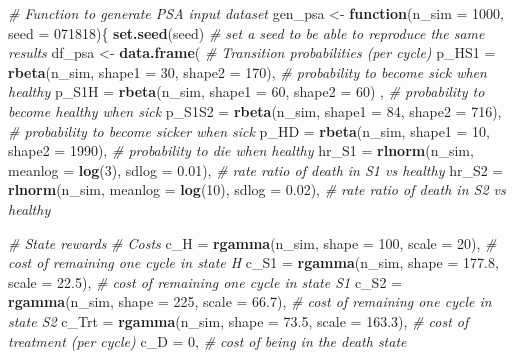 \documentclass[
]{article}
\newenvironment{Shaded}{\begin{snugshade}}{\end{snugshade}}
\newcommand{\CommentTok}[1]{\textcolor[rgb]{0.56,0.35,0.01}{\textit{#1}}}
\newcommand{\ControlFlowTok}[1]{\textcolor[rgb]{0.13,0.29,0.53}{\textbf{#1}}}
\newcommand{\DataTypeTok}[1]{\textcolor[rgb]{0.13,0.29,0.53}{#1}}
\newcommand{\DecValTok}[1]{\textcolor[rgb]{0.00,0.00,0.81}{#1}}
\newcommand{\FloatTok}[1]{\textcolor[rgb]{0.00,0.00,0.81}{#1}}
\newcommand{\KeywordTok}[1]{\textcolor[rgb]{0.13,0.29,0.53}{\textbf{#1}}}
\newcommand{\NormalTok}[1]{#1}
\newcommand{\StringTok}[1]{\textcolor[rgb]{0.31,0.60,0.02}{#1}}
\begin{document}
\begin{Shaded}
\begin{Highlighting}[]
\CommentTok{# Function to generate PSA input dataset}
\NormalTok{gen_psa <-}\StringTok{ }\ControlFlowTok{function}\NormalTok{(}\DataTypeTok{n_sim =} \DecValTok{1000}\NormalTok{, }\DataTypeTok{seed =} \DecValTok{071818}\NormalTok{)\{}
  \KeywordTok{set.seed}\NormalTok{(seed) }\CommentTok{# set a seed to be able to reproduce the same results}
\NormalTok{  df_psa <-}\StringTok{ }\KeywordTok{data.frame}\NormalTok{(}
    \CommentTok{# Transition probabilities (per cycle)}
    \DataTypeTok{p_HS1   =} \KeywordTok{rbeta}\NormalTok{(n_sim, }\DataTypeTok{shape1 =} \DecValTok{30}\NormalTok{, }\DataTypeTok{shape2 =} \DecValTok{170}\NormalTok{),     }\CommentTok{# probability to become sick when healthy}
    \DataTypeTok{p_S1H   =} \KeywordTok{rbeta}\NormalTok{(n_sim, }\DataTypeTok{shape1 =} \DecValTok{60}\NormalTok{, }\DataTypeTok{shape2 =} \DecValTok{60}\NormalTok{) ,     }\CommentTok{# probability to become healthy when sick}
    \DataTypeTok{p_S1S2  =} \KeywordTok{rbeta}\NormalTok{(n_sim, }\DataTypeTok{shape1 =} \DecValTok{84}\NormalTok{, }\DataTypeTok{shape2 =} \DecValTok{716}\NormalTok{),     }\CommentTok{# probability to become sicker when sick}
    \DataTypeTok{p_HD    =} \KeywordTok{rbeta}\NormalTok{(n_sim, }\DataTypeTok{shape1 =} \DecValTok{10}\NormalTok{, }\DataTypeTok{shape2 =} \DecValTok{1990}\NormalTok{),    }\CommentTok{# probability to die when healthy}
    \DataTypeTok{hr_S1   =} \KeywordTok{rlnorm}\NormalTok{(n_sim, }\DataTypeTok{meanlog =} \KeywordTok{log}\NormalTok{(}\DecValTok{3}\NormalTok{),  }\DataTypeTok{sdlog =} \FloatTok{0.01}\NormalTok{),  }\CommentTok{# rate ratio of death in S1 vs healthy}
    \DataTypeTok{hr_S2   =} \KeywordTok{rlnorm}\NormalTok{(n_sim, }\DataTypeTok{meanlog =} \KeywordTok{log}\NormalTok{(}\DecValTok{10}\NormalTok{), }\DataTypeTok{sdlog =} \FloatTok{0.02}\NormalTok{),  }\CommentTok{# rate ratio of death in S2 vs healthy }
    
    \CommentTok{# State rewards}
    \CommentTok{# Costs}
    \DataTypeTok{c_H   =} \KeywordTok{rgamma}\NormalTok{(n_sim, }\DataTypeTok{shape =} \DecValTok{100}\NormalTok{, }\DataTypeTok{scale =} \DecValTok{20}\NormalTok{),     }\CommentTok{# cost of remaining one cycle in state H}
    \DataTypeTok{c_S1  =} \KeywordTok{rgamma}\NormalTok{(n_sim, }\DataTypeTok{shape =} \FloatTok{177.8}\NormalTok{, }\DataTypeTok{scale =} \FloatTok{22.5}\NormalTok{), }\CommentTok{# cost of remaining one cycle in state S1}
    \DataTypeTok{c_S2  =} \KeywordTok{rgamma}\NormalTok{(n_sim, }\DataTypeTok{shape =} \DecValTok{225}\NormalTok{, }\DataTypeTok{scale =} \FloatTok{66.7}\NormalTok{),   }\CommentTok{# cost of remaining one cycle in state S2}
    \DataTypeTok{c_Trt =} \KeywordTok{rgamma}\NormalTok{(n_sim, }\DataTypeTok{shape =} \FloatTok{73.5}\NormalTok{, }\DataTypeTok{scale =} \FloatTok{163.3}\NormalTok{), }\CommentTok{# cost of treatment (per cycle)}
    \DataTypeTok{c_D   =} \DecValTok{0}\NormalTok{,                                          }\CommentTok{# cost of being in the death state}
    

\end{Highlighting}
\end{Shaded}
\end{document}
